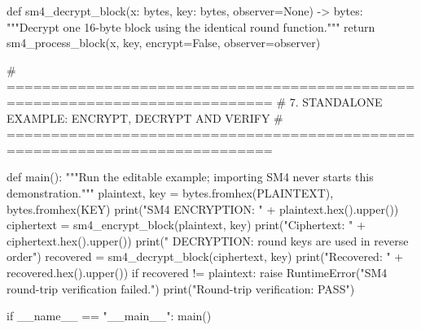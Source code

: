 \begin{lightcode}[numbers=left,firstnumber=1]
def sm4_decrypt_block(x: bytes, key: bytes, observer=None) -> bytes:
    """Decrypt one 16-byte block using the identical round function."""
    return sm4_process_block(x, key, encrypt=False, observer=observer)


# ============================================================================
# 7. STANDALONE EXAMPLE: ENCRYPT, DECRYPT AND VERIFY
# ============================================================================


def main():
    """Run the editable example; importing SM4 never starts this demonstration."""
    plaintext, key = bytes.fromhex(PLAINTEXT), bytes.fromhex(KEY)
    print("SM4 ENCRYPTION\nPlaintext: " + plaintext.hex().upper())
    ciphertext = sm4_encrypt_block(plaintext, key)
    print("Ciphertext: " + ciphertext.hex().upper())
    print(" DECRYPTION: round keys are used in reverse order")
    recovered = sm4_decrypt_block(ciphertext, key)
    print("Recovered: " + recovered.hex().upper())
    if recovered != plaintext:
        raise RuntimeError("SM4 round-trip verification failed.")
    print("Round-trip verification: PASS")


if __name__ == "__main__":
    main()
\end{lightcode}
